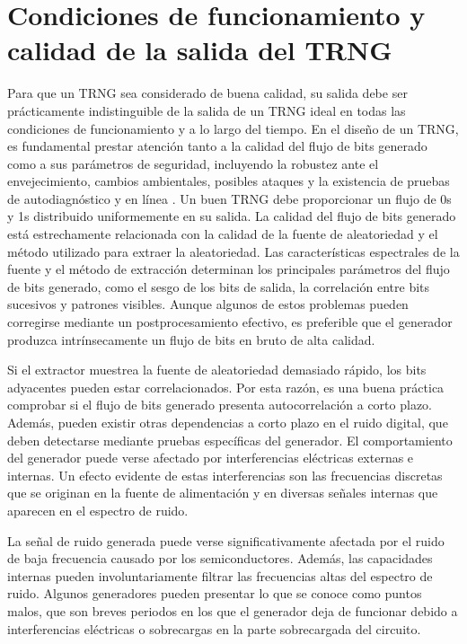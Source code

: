     \section{Condiciones de funcionamiento y calidad de la salida del TRNG}

            Para que un TRNG sea considerado de buena calidad, su salida debe ser prácticamente indistinguible de la salida de un TRNG ideal en todas las condiciones de funcionamiento y a lo largo del tiempo. En el diseño de un TRNG, es fundamental prestar atención tanto a la calidad del flujo de bits generado como a sus parámetros de seguridad, incluyendo la robustez ante el envejecimiento, cambios ambientales, posibles ataques y la existencia de pruebas de autodiagnóstico y en línea \cite{Schindler2003}.
            Un buen TRNG debe proporcionar un flujo de 0s y 1s distribuido uniformemente en su salida. La calidad del flujo de bits generado está estrechamente relacionada con la calidad de la fuente de aleatoriedad y el método utilizado para extraer la aleatoriedad. Las características espectrales de la fuente y el método de extracción determinan los principales parámetros del flujo de bits generado, como el sesgo de los bits de salida, la correlación entre bits sucesivos y patrones visibles. Aunque algunos de estos problemas pueden corregirse mediante un postprocesamiento efectivo, es preferible que el generador produzca intrínsecamente un flujo de bits en bruto de alta calidad.

            Si el extractor muestrea la fuente de aleatoriedad demasiado rápido, los bits adyacentes pueden estar correlacionados. Por esta razón, es una buena práctica comprobar si el flujo de bits generado presenta autocorrelación a corto plazo. Además, pueden existir otras dependencias a corto plazo en el ruido digital, que deben detectarse mediante pruebas específicas del generador. El comportamiento del generador puede verse afectado por interferencias eléctricas externas e internas. Un efecto evidente de estas interferencias son las frecuencias discretas que se originan en la fuente de alimentación y en diversas señales internas que aparecen en el espectro de ruido.

            La señal de ruido generada puede verse significativamente afectada por el ruido de baja frecuencia causado por los semiconductores. Además, las capacidades internas pueden involuntariamente filtrar las frecuencias altas del espectro de ruido. Algunos generadores pueden presentar lo que se conoce como puntos malos, que son breves periodos en los que el generador deja de funcionar debido a interferencias eléctricas o sobrecargas en la parte sobrecargada del circuito.

